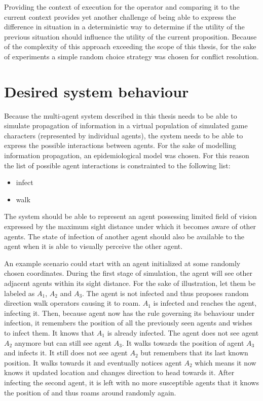 Providing the context of execution for the operator and comparing it to the current context provides yet another challenge of being able to express the difference in situation in a deterministic way to determine if the utility of the previous situation should influence the utility of the current proposition.
Because of the complexity of this approach exceeding the scope of this thesis, for the sake of experiments a simple random choice strategy was chosen for conflict resolution.

\section{Desired system behaviour}

Because the multi-agent system described in this thesis needs to be able to simulate propagation of information in a virtual population of simulated game characters (represented by individual agents), the system needs to be able to express the possible interactions between agents.
For the sake of modelling information propagation, an epidemiological model was chosen.
For this reason the list of possible agent interactions is constrainted to the following list:

\begin{itemize}
    \item infect
    \item walk
\end{itemize}

The system should be able to represent an agent possessing limited field of vision expressed by the maximum sight distance under which it becomes aware of other agents.
The state of infection of another agent should also be available to the agent when it is able to visually perceive the other agent.

An example scenario could start with an agent initialized at some randomly chosen coordinates.
During the first stage of simulation, the agent will see other adjacent agents within its sight distance.
For the sake of illustration, let them be labeled as $A_1$, $A_2$ and $A_3$.
The agent is not infected and thus proposes random direction walk operators causing it to roam.
$A_1$ is infected and reaches the agent, infecting it.
Then, because agent now has the rule governing its behaviour under infection, it remembers the position of all the previously seen agents and wishes to infect them.
It knows that $A_1$ is already infected.
The agent does not see agent $A_2$ anymore but can still see agent $A_3$.
It walks towards the position of agent $A_3$ and infects it.
It still does not see agent $A_2$ but remembers that its last known position.
It walks towards it and eventually notices agent $A_2$ which means it now knows it updated location and changes direction to head towards it.
After infecting the second agent, it is left with no more susceptible agents that it knows the position of and thus roams around randomly again.

